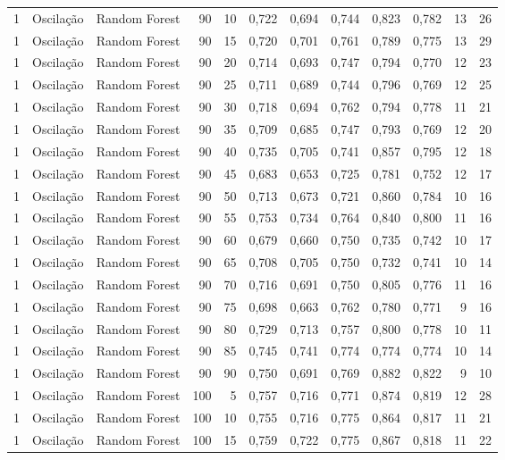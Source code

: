 \begin{longtable}{@{}rllrrrrrrrrr@{}}
1 & Oscilação & Random Forest & 90 & 10 & 0,722 & 0,694 & 0,744 & 0,823 & 0,782 & 13 & 26 \\
1 & Oscilação & Random Forest & 90 & 15 & 0,720 & 0,701 & 0,761 & 0,789 & 0,775 & 13 & 29 \\
1 & Oscilação & Random Forest & 90 & 20 & 0,714 & 0,693 & 0,747 & 0,794 & 0,770 & 12 & 23 \\
1 & Oscilação & Random Forest & 90 & 25 & 0,711 & 0,689 & 0,744 & 0,796 & 0,769 & 12 & 25 \\
1 & Oscilação & Random Forest & 90 & 30 & 0,718 & 0,694 & 0,762 & 0,794 & 0,778 & 11 & 21 \\
1 & Oscilação & Random Forest & 90 & 35 & 0,709 & 0,685 & 0,747 & 0,793 & 0,769 & 12 & 20 \\
1 & Oscilação & Random Forest & 90 & 40 & 0,735 & 0,705 & 0,741 & 0,857 & 0,795 & 12 & 18 \\
1 & Oscilação & Random Forest & 90 & 45 & 0,683 & 0,653 & 0,725 & 0,781 & 0,752 & 12 & 17 \\
1 & Oscilação & Random Forest & 90 & 50 & 0,713 & 0,673 & 0,721 & 0,860 & 0,784 & 10 & 16 \\
1 & Oscilação & Random Forest & 90 & 55 & 0,753 & 0,734 & 0,764 & 0,840 & 0,800 & 11 & 16 \\
1 & Oscilação & Random Forest & 90 & 60 & 0,679 & 0,660 & 0,750 & 0,735 & 0,742 & 10 & 17 \\
1 & Oscilação & Random Forest & 90 & 65 & 0,708 & 0,705 & 0,750 & 0,732 & 0,741 & 10 & 14 \\
1 & Oscilação & Random Forest & 90 & 70 & 0,716 & 0,691 & 0,750 & 0,805 & 0,776 & 11 & 16 \\
1 & Oscilação & Random Forest & 90 & 75 & 0,698 & 0,663 & 0,762 & 0,780 & 0,771 & 9 & 16 \\
1 & Oscilação & Random Forest & 90 & 80 & 0,729 & 0,713 & 0,757 & 0,800 & 0,778 & 10 & 11 \\
1 & Oscilação & Random Forest & 90 & 85 & 0,745 & 0,741 & 0,774 & 0,774 & 0,774 & 10 & 14 \\
1 & Oscilação & Random Forest & 90 & 90 & 0,750 & 0,691 & 0,769 & 0,882 & 0,822 & 9 & 10 \\
1 & Oscilação & Random Forest & 100 & 5 & 0,757 & 0,716 & 0,771 & 0,874 & 0,819 & 12 & 28 \\
1 & Oscilação & Random Forest & 100 & 10 & 0,755 & 0,716 & 0,775 & 0,864 & 0,817 & 11 & 21 \\
1 & Oscilação & Random Forest & 100 & 15 & 0,759 & 0,722 & 0,775 & 0,867 & 0,818 & 11 & 22 \\

\end{longtable}
